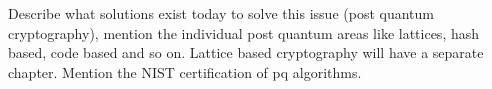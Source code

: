 

Describe what solutions exist today to solve this issue (post quantum cryptography), mention the individual post quantum areas like lattices, hash based, code based and so on. Lattice based cryptography will have a separate chapter. Mention the NIST certification of pq algorithms.